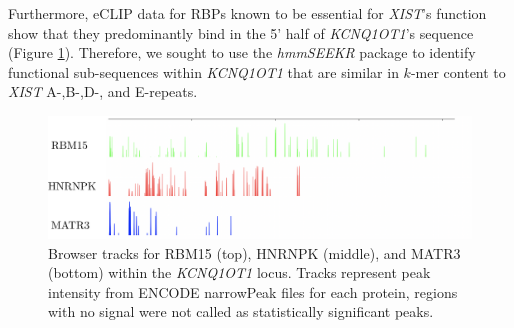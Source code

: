 Furthermore, eCLIP data for RBPs known to be essential for \emph{XIST}'s function show that they predominantly bind in the 5' half of \emph{KCNQ1OT1}'s sequence (Figure \ref{fig:kcnproteins}). Therefore, we sought to use the \emph{hmmSEEKR} package to identify functional sub-sequences within \emph{KCNQ1OT1} that are similar in $k$-mer content to \emph{XIST} A-,B-,D-, and E-repeats. 


\begin{figure}[h!]
\centering
\includegraphics[width=\textwidth]{images/kcnproteins.pdf}
\caption[\emph{KCNQ1OT1} RBM15, HNRNPK, and MATR3 eCLIP tracks]{Browser tracks for RBM15 (top), HNRNPK (middle), and MATR3 (bottom) within the \emph{KCNQ1OT1} locus. Tracks represent peak intensity from ENCODE narrowPeak files for each protein, regions with no signal were not called as statistically significant peaks. }
\label{fig:kcnproteins}
\end{figure}

